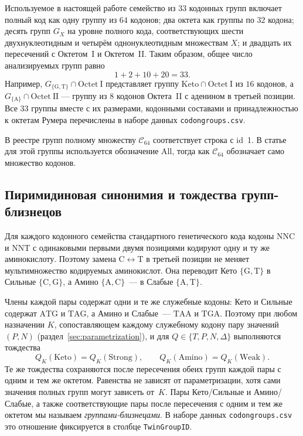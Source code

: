 \documentclass[11pt,a4paper]{article}
\renewcommand{\_}{\origunderscore\allowbreak}
\begin{document}
Используемое в настоящей работе семейство из $33$ кодонных групп
включает полный код как одну группу из $64$ кодонов; два октета
как группы по $32$ кодона; десять групп $G_X$ на уровне полного
кода, соответствующих шести двухнуклеотидным и четырём
однонуклеотидным множествам $X$; и двадцать их пересечений с
Октетом~I и Октетом~II. Таким образом, общее число анализируемых
групп равно
\[
1+2+10+20=33.
\]
Например, $G_{\{\mathrm{G},\mathrm{T}\}}\cap
\mathrm{Octet~I}$ представляет группу
$\mathrm{Keto}\cap\mathrm{Octet~I}$ из $16$ кодонов, а
$G_{\{\mathrm{A}\}}\cap\mathrm{Octet~II}$ --- группу из $8$
кодонов Октета~II с аденином в третьей позиции. Все $33$ группы
вместе с их размерами, кодонными составами и принадлежностью к
октетам Румера перечислены в наборе данных
\texttt{codon\_groups.csv}.

В реестре групп полному множеству $\mathcal{C}_{64}$ соответствует
строка с id~1. В статье для этой группы используется обозначение
$\mathrm{All}$, тогда как $\mathcal{C}_{64}$ обозначает само множество
кодонов.

\subsection{Пиримидиновая синонимия и тождества групп-близнецов}
\label{sec:twin-identities}

Для каждого кодонного семейства стандартного генетического кода кодоны
$\mathrm{NNC}$ и $\mathrm{NNT}$ с одинаковыми первыми двумя позициями
кодируют одну и ту же аминокислоту. Поэтому замена
$\mathrm{C}\leftrightarrow\mathrm{T}$ в третьей позиции не меняет
мультимножество кодируемых аминокислот. Она переводит Кето
$\{\mathrm{G},\mathrm{T}\}$ в Сильные
$\{\mathrm{C},\mathrm{G}\}$, а Амино
$\{\mathrm{A},\mathrm{C}\}$~--- в Слабые
$\{\mathrm{A},\mathrm{T}\}$.

Члены каждой пары содержат одни и те же служебные кодоны: Кето и
Сильные содержат $\mathrm{ATG}$ и $\mathrm{TAG}$, а Амино и
Слабые~--- $\mathrm{TAA}$ и $\mathrm{TGA}$. Поэтому при любом
назначении $K$, сопоставляющем каждому служебному кодону пару значений
$(P,N)$ (раздел~\ref{sec:parametrization}), и для
$Q\in\{T,P,N,\Delta\}$ выполняются тождества
\[
Q_K(\mathrm{Keto})=Q_K(\mathrm{Strong}),\qquad
Q_K(\mathrm{Amino})=Q_K(\mathrm{Weak}).
\]
Те же тождества сохраняются после пересечения обеих групп каждой пары
с одним и тем же октетом. Равенства не зависят от параметризации, хотя
сами значения полных групп могут зависеть от~$K$. Пары Кето/Сильные и
Амино/Слабые, а также соответствующие пары после пересечения с одним и
тем же октетом мы называем \emph{группами-близнецами}. В наборе данных
\texttt{codon\_groups.csv} это отношение фиксируется в столбце
\texttt{Twin\_Group\_ID}.
\end{document}
